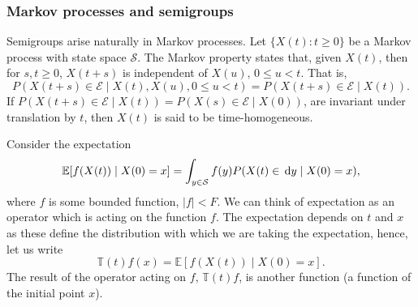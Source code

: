 \subsubsection{Markov processes and semigroups}
Semigroups arise naturally in Markov processes. Let \(\{X(t):t\geq 0\}\) be a Markov process with state space \(\mathcal S\). The Markov property states that, given \(X(t)\), then for \(s,t\geq 0\), \(X(t+s)\) is independent of \(X(u),\, 0\leq u<t\). That is, \[P(X(t+s)\in\mathcal{E} \mid X(t), X(u), 0\leq u<t)=P(X(t+s)\in\mathcal{E} \mid X(t)).\] 
If \(P(X(t+s)\in\mathcal{E} \mid X(t))=P(X(s)\in\mathcal{E} \mid X(0))\), are invariant under translation by \(t\), then \(X(t)\) is said to be time-homogeneous.


 
Consider the expectation
\[\mathbb E[f(X(t))\mid X(0)=x]=\int_{y\in\mathcal{S}} f(y) P(X(t)\in\, \mathrm{d} y\mid X(0)=x),\]
where \(f\) is some bounded function, \(|f|<F\). We can think of expectation as an operator which is acting on the function \(f\). The expectation depends on \(t\) and \(x\) as these define the distribution with which we are taking the expectation, hence, let us write 
\[\mathbb T(t)f(x) = \mathbb E[f(X(t))\mid X(0)=x].\]
The result of the operator acting on \(f\), \(\mathbb T(t)f\), is another function (a function of the initial point \(x\)).


